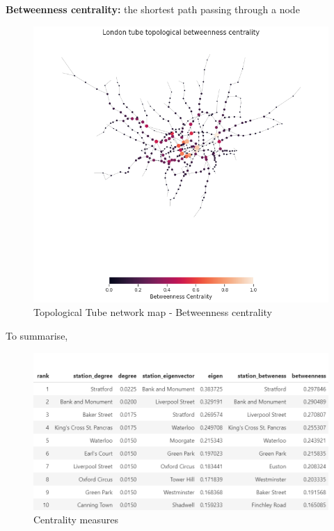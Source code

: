 \documentclass[10pt]{report}
\numberwithin{figure}{section}
\numberwithin{table}{section}
\begin{document}
   \vspace{5mm} %
   
        \textbf{Betweenness centrality:} the shortest path passing through a node
        
    \begin{figure}[htp]
        \centering
        \includegraphics[width=14cm]{Image/Part1_topologicalmap_betweenness.png}
        \caption{Topological Tube network map - Betweenness centrality}
        \label{fig:galaxy}
    \end{figure} 


    To summarise,     

    \begin{figure}[htp]
        \centering
        \includegraphics[width=14cm]{Image/Table_CentralitiesMeasures.png}
        \caption{Centrality measures}
        \label{fig:galaxy}
    \end{figure}
\end{document}
